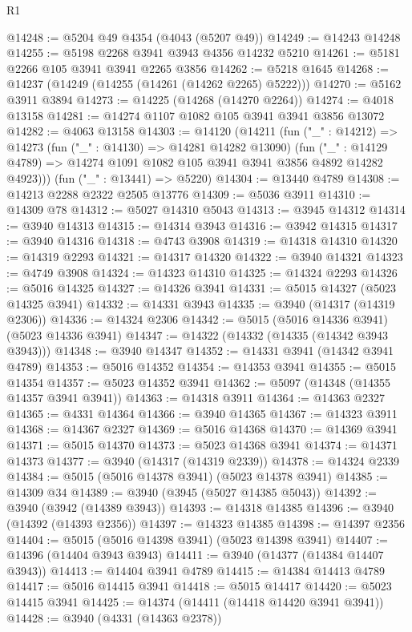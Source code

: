 \begin{lexlean}{R1}
\begin{coremodule}
@14248 := @5204 @49 @4354 (@4043 (@5207 @49))
@14249 := @14243 @14248
@14255 := @5198 @2268 @3941 @3943 @4356 @14232 @5210
@14261 := @5181 @2266 @105 @3941 @3941 @2265 @3856
@14262 := @5218 @1645
@14268 := @14237 (@14249 (@14255 (@14261 (@14262 @2265) @5222)))
@14270 := @5162 @3911 @3894
@14273 := @14225 (@14268 (@14270 @2264))
@14274 := @4018 @13158
@14281 := @14274 @1107 @1082 @105 @3941 @3941 @3856 @13072
@14282 := @4063 @13158
@14303 := @14120
    (@14211
      (fun ("_" : @14212) =>
      @14273
        (fun ("_" : @14130) => @14281 @14282 @13090)
        (fun ("_" : @14129 @4789) => @14274 @1091 @1082 @105 @3941 @3941 @3856 @4892 @14282 @4923)))
    (fun ("_" : @13441) => @5220)
@14304 := @13440 @4789
@14308 := @14213 @2288 @2322 @2505 @13776
@14309 := @5036 @3911
@14310 := @14309 @78
@14312 := @5027 @14310 @5043
@14313 := @3945 @14312
@14314 := @3940 @14313
@14315 := @14314 @3943
@14316 := @3942 @14315
@14317 := @3940 @14316
@14318 := @4743 @3908
@14319 := @14318 @14310
@14320 := @14319 @2293
@14321 := @14317 @14320
@14322 := @3940 @14321
@14323 := @4749 @3908
@14324 := @14323 @14310
@14325 := @14324 @2293
@14326 := @5016 @14325
@14327 := @14326 @3941
@14331 := @5015 @14327 (@5023 @14325 @3941)
@14332 := @14331 @3943
@14335 := @3940 (@14317 (@14319 @2306))
@14336 := @14324 @2306
@14342 := @5015 (@5016 @14336 @3941) (@5023 @14336 @3941)
@14347 := @14322 (@14332 (@14335 (@14342 @3943 @3943)))
@14348 := @3940 @14347
@14352 := @14331 @3941 (@14342 @3941 @4789)
@14353 := @5016 @14352
@14354 := @14353 @3941
@14355 := @5015 @14354
@14357 := @5023 @14352 @3941
@14362 := @5097 (@14348 (@14355 @14357 @3941 @3941))
@14363 := @14318 @3911
@14364 := @14363 @2327
@14365 := @4331 @14364
@14366 := @3940 @14365
@14367 := @14323 @3911
@14368 := @14367 @2327
@14369 := @5016 @14368
@14370 := @14369 @3941
@14371 := @5015 @14370
@14373 := @5023 @14368 @3941
@14374 := @14371 @14373
@14377 := @3940 (@14317 (@14319 @2339))
@14378 := @14324 @2339
@14384 := @5015 (@5016 @14378 @3941) (@5023 @14378 @3941)
@14385 := @14309 @34
@14389 := @3940 (@3945 (@5027 @14385 @5043))
@14392 := @3940 (@3942 (@14389 @3943))
@14393 := @14318 @14385
@14396 := @3940 (@14392 (@14393 @2356))
@14397 := @14323 @14385
@14398 := @14397 @2356
@14404 := @5015 (@5016 @14398 @3941) (@5023 @14398 @3941)
@14407 := @14396 (@14404 @3943 @3943)
@14411 := @3940 (@14377 (@14384 @14407 @3943))
@14413 := @14404 @3941 @4789
@14415 := @14384 @14413 @4789
@14417 := @5016 @14415 @3941
@14418 := @5015 @14417
@14420 := @5023 @14415 @3941
@14425 := @14374 (@14411 (@14418 @14420 @3941 @3941))
@14428 := @3940 (@4331 (@14363 @2378))

\end{coremodule}
\end{lexlean}
